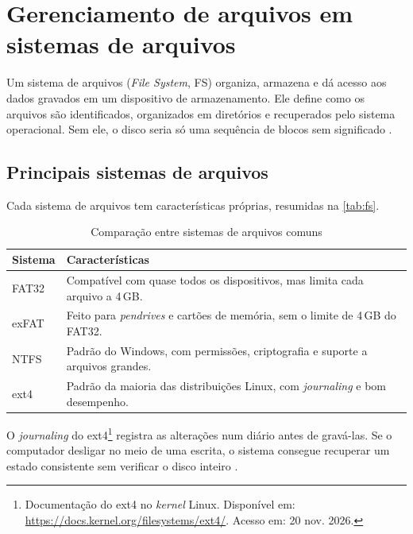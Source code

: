 \chapter{Gerenciamento de arquivos em sistemas de arquivos}\label{cap:arquivos}

Um sistema de arquivos (\textit{File System}, FS) organiza, armazena e dá acesso aos dados
gravados em um dispositivo de armazenamento. Ele define como os arquivos são identificados,
organizados em diretórios e recuperados pelo sistema operacional. Sem ele, o disco seria só
uma sequência de blocos sem significado \cite{tanenbaum2016}.

\section{Principais sistemas de arquivos}\label{sec:principais-fs}

Cada sistema de arquivos tem características próprias, resumidas na \autoref{tab:fs}.

\begin{table}[H]
    \centering
    \caption{Comparação entre sistemas de arquivos comuns}
    \label{tab:fs}
    \begin{tabularx}{\linewidth}{lX}
        \toprule
        \textbf{Sistema} & \textbf{Características} \\
        \midrule
        FAT32 & Compatível com quase todos os dispositivos, mas limita cada arquivo a 4\,GB. \\
        exFAT & Feito para \textit{pendrives} e cartões de memória, sem o limite de 4\,GB do FAT32. \\
        NTFS & Padrão do Windows, com permissões, criptografia e suporte a arquivos grandes. \\
        ext4 & Padrão da maioria das distribuições Linux, com \textit{journaling} e bom desempenho. \\
        \bottomrule
    \end{tabularx}
\end{table}

O \textit{journaling} do ext4\footnote{Documentação do ext4 no \textit{kernel} Linux.
Disponível em: \url{https://docs.kernel.org/filesystems/ext4/}. Acesso em: 20 nov. 2026.}
registra as alterações num diário antes de gravá-las. Se o
computador desligar no meio de uma escrita, o sistema consegue recuperar um estado consistente
sem verificar o disco inteiro \cite{silberschatz2015}.

